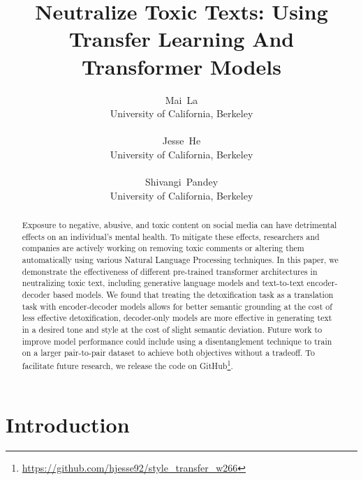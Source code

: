 \documentclass[11pt]{article}
\title{Neutralize Toxic Texts: Using Transfer Learning And Transformer Models}
\author{
    Mai~La \\ \small\rmfamily\upshape University of California, Berkeley \\
    \small\rmfamily\upshape {mai.la@berkeley.edu} \\ \And
    Jesse~He \\
    \small\rmfamily\upshape University of California, Berkeley \\
    \small\rmfamily\upshape {hjesse92@berkeley.edu} \\ \And
    Shivangi~Pandey \\
    \small\rmfamily\upshape University of California, Berkeley \\
    \small\rmfamily\upshape {shivangi.pandey@berkeley.edu} }
\begin{document}
{\makeatletter\acl@finalcopytrue
  \maketitle
}

  
\begin{abstract}
Exposure to negative, abusive, and toxic content on social media can have detrimental effects on an individual's mental health. To mitigate these effects, researchers and companies are actively working on removing toxic comments or altering them automatically using various Natural Language Processing techniques. In this paper, we demonstrate the effectiveness of different pre-trained transformer architectures in neutralizing toxic text, including generative language models and text-to-text encoder-decoder based models. We found that treating the detoxification task as a translation task with encoder-decoder models allows for better semantic grounding at the cost of less effective detoxification, decoder-only models are more effective in generating text in a desired tone and style at the cost of slight semantic deviation. Future work to improve model performance could include using a disentanglement technique to train on a larger pair-to-pair dataset to achieve both objectives without a tradeoff. To facilitate future research, we release the code on GitHub\footnote{\url{https://github.com/hjesse92/style_transfer_w266}}.
\end{abstract}

\section{Introduction}
\end{document}
